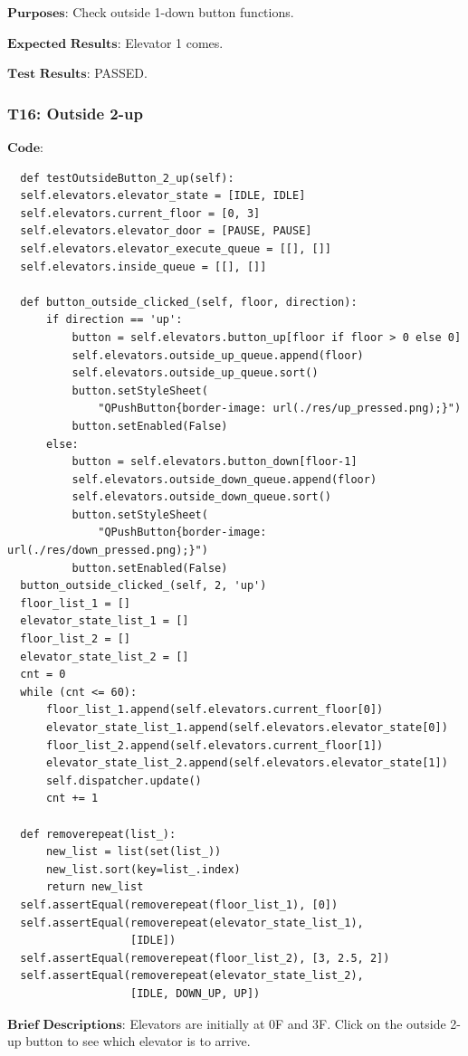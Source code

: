 \documentclass{article}
\begin{document}
$\textbf{Purposes:}$
Check outside 1-down button functions.

$\textbf{Expected Results:}$
Elevator 1 comes.

$\textbf{Test Results:}$
PASSED.

\subsubsection*{T16: Outside 2-up}
$\textbf{Code:}$
\begin{lstlisting}
  def testOutsideButton_2_up(self):
  self.elevators.elevator_state = [IDLE, IDLE]
  self.elevators.current_floor = [0, 3]
  self.elevators.elevator_door = [PAUSE, PAUSE]
  self.elevators.elevator_execute_queue = [[], []]
  self.elevators.inside_queue = [[], []]

  def button_outside_clicked_(self, floor, direction):
      if direction == 'up':
          button = self.elevators.button_up[floor if floor > 0 else 0]
          self.elevators.outside_up_queue.append(floor)
          self.elevators.outside_up_queue.sort()
          button.setStyleSheet(
              "QPushButton{border-image: url(./res/up_pressed.png);}")
          button.setEnabled(False)
      else:
          button = self.elevators.button_down[floor-1]
          self.elevators.outside_down_queue.append(floor)
          self.elevators.outside_down_queue.sort()
          button.setStyleSheet(
              "QPushButton{border-image: url(./res/down_pressed.png);}")
          button.setEnabled(False)
  button_outside_clicked_(self, 2, 'up')
  floor_list_1 = []
  elevator_state_list_1 = []
  floor_list_2 = []
  elevator_state_list_2 = []
  cnt = 0
  while (cnt <= 60):
      floor_list_1.append(self.elevators.current_floor[0])
      elevator_state_list_1.append(self.elevators.elevator_state[0])
      floor_list_2.append(self.elevators.current_floor[1])
      elevator_state_list_2.append(self.elevators.elevator_state[1])
      self.dispatcher.update()
      cnt += 1

  def removerepeat(list_):
      new_list = list(set(list_))
      new_list.sort(key=list_.index)
      return new_list
  self.assertEqual(removerepeat(floor_list_1), [0])
  self.assertEqual(removerepeat(elevator_state_list_1),
                   [IDLE])
  self.assertEqual(removerepeat(floor_list_2), [3, 2.5, 2])
  self.assertEqual(removerepeat(elevator_state_list_2),
                   [IDLE, DOWN_UP, UP])
\end{lstlisting}

$\textbf{Brief Descriptions:}$
Elevators are initially at 0F and 3F. Click on the outside 2-up button to see which elevator is to arrive.
\end{document}
